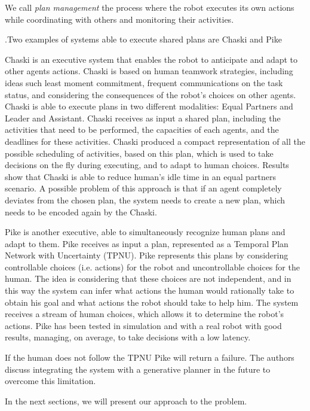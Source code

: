 We call \textit{plan management} the process where the robot executes its own actions while coordinating with others and monitoring their activities. 

.Two examples of systems able to execute shared plans are  Chaski \cite{shah2011improved} and Pike \cite{levine2014concurrent,karpas2015robust}

Chaski is an executive system that enables the robot to anticipate and adapt to other agents actions. Chaski is based on human teamwork strategies, including ideas such least moment commitment, frequent communications on the task status, and considering the consequences of the robot's choices on other agents. Chaski is able to execute plans in two different modalities: Equal Partners and Leader and Assistant. Chaski receives as input a shared plan, including the activities that need to be performed, the capacities of each agents, and the deadlines for these activities. Chaski produced a compact representation of all the possible scheduling of activities, based on this plan, which is used to take decisions on the fly during executing, and to adapt to human choices. Results show that Chaski is able to reduce human's idle time in an equal partners scenario. A possible problem of this approach is that if an agent completely deviates from the chosen plan, the system needs to create a new plan, which needs to be encoded again by the Chaski.

Pike is another executive, able to simultaneously recognize human plans and adapt to them. Pike receives as input a plan, represented as a Temporal Plan Network with Uncertainty (TPNU). Pike represents this plans by considering controllable choices (i.e. actions) for the robot and uncontrollable choices for the human. The idea is considering that these choices are not independent, and in this way the system can infer what actions the human would rationally take to obtain his goal and what actions the robot should take to help him. The system receives a stream of human choices, which allows it to determine the robot's actions. Pike has been tested in simulation and with a real robot with good results, managing, on average, to take decisions with a low latency.

If the human does not follow the TPNU Pike will return a failure. The authors discuss integrating the system with a generative planner in the future to overcome this limitation.

In the next sections, we will present our approach to the problem.

